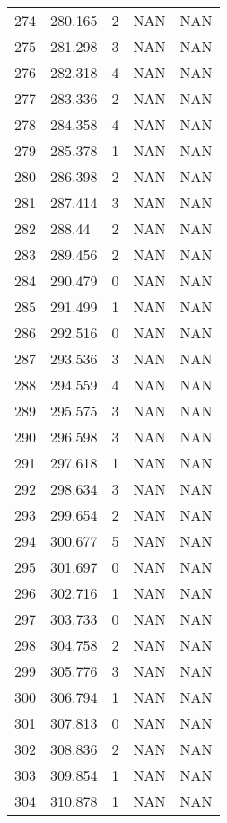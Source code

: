 \documentclass{article}
\begin{document}
\begin{longtable}{@{}lllll@{}}
					274 & 280.165 & 2     & NAN   & NAN   \\
					275 & 281.298 & 3     & NAN   & NAN   \\
					276 & 282.318 & 4     & NAN   & NAN   \\
					277 & 283.336 & 2     & NAN   & NAN   \\
					278 & 284.358 & 4     & NAN   & NAN   \\
					279 & 285.378 & 1     & NAN   & NAN   \\
					280 & 286.398 & 2     & NAN   & NAN   \\
					281 & 287.414 & 3     & NAN   & NAN   \\
					282 & 288.44  & 2     & NAN   & NAN   \\
					283 & 289.456 & 2     & NAN   & NAN   \\
					284 & 290.479 & 0     & NAN   & NAN   \\
					285 & 291.499 & 1     & NAN   & NAN   \\
					286 & 292.516 & 0     & NAN   & NAN   \\
					287 & 293.536 & 3     & NAN   & NAN   \\
					288 & 294.559 & 4     & NAN   & NAN   \\
					289 & 295.575 & 3     & NAN   & NAN   \\
					290 & 296.598 & 3     & NAN   & NAN   \\
					291 & 297.618 & 1     & NAN   & NAN   \\
					292 & 298.634 & 3     & NAN   & NAN   \\
					293 & 299.654 & 2     & NAN   & NAN   \\
					294 & 300.677 & 5     & NAN   & NAN   \\
					295 & 301.697 & 0     & NAN   & NAN   \\
					296 & 302.716 & 1     & NAN   & NAN   \\
					297 & 303.733 & 0     & NAN   & NAN   \\
					298 & 304.758 & 2     & NAN   & NAN   \\
					299 & 305.776 & 3     & NAN   & NAN   \\
					300 & 306.794 & 1     & NAN   & NAN   \\
					301 & 307.813 & 0     & NAN   & NAN   \\
					302 & 308.836 & 2     & NAN   & NAN   \\
					303 & 309.854 & 1     & NAN   & NAN   \\
					304 & 310.878 & 1     & NAN   & NAN   \\

\end{longtable}
\end{document}
